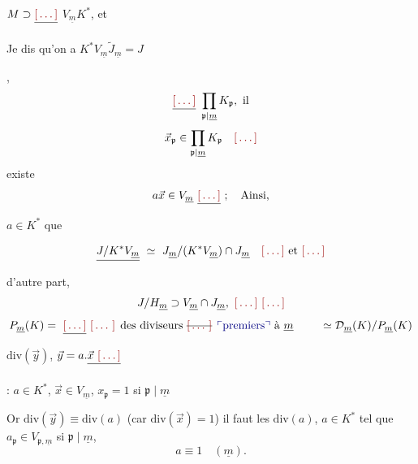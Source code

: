 \documentclass[11pt,a4paper]{article}
\begin{document}
 $M \supset \struck{\ill{}}$ $V_{\underline{m}} K^{*}$, et
 \ill{} \ill{} \ill{} \ill{}

Je dis qu'on a \struck{\ill{}} $K^{*} V_{\underline{m}} \tilde J_{\underline{m}} = J$ \ill{} \ill{}

 \ill{}  \ill{}, \struck{\ill{}} \ill{}
\ill{}
\[
\struck{\ill{}}\ \prod_{\mathfrak{p} \mid \underline{m}} K_{\mathfrak{p}}, \ \text{il}
\]
\ill{} \ill{} \ill{} \ill{}
\[
\vec{x}_{\mathfrak{p}} \in \prod_{\mathfrak{p}\mid\underline{m}} K_{\mathfrak{p}} \quad \ill{}
\]
existe  \ill{} \ill{}
\[
a \vec{x} \in V_{\underline{m}} \ \struck{\ill{}}\ ; \quad \text{Ainsi,}
\]
$a \in K^{*}$  que \ill{}

\ill{} \ill{}
\[
\struck{J/K^{*}V_{\underline{m}}}\ \simeq\ J_{\underline{m}}/(K^{*}V_{\underline{m}}) \cap J_{\underline{m}} \quad \ill{} \ \text{et} \ \ill{}
\]
d'autre part, 
\[
J/H_{\underline{m}} \supset V_{\underline{m}} \cap J_{\underline{m}}, \ \ill{} \ \ill{}
\]
\[
P_{\underline{m}}(K) = \ \struck{\ill{}}\ \text{\ill{} des diviseurs \struck{\ill{}} \add{premiers} à } \underline{m}
\qquad \ \simeq \mathcal{D}_{\underline{m}}(K)/P_{\underline{m}}(K)
\]
 \ill{} $\mathrm{div}(\vec{y})$, 
$\vec{y} = a . \struck{\vec{x}\ \ill{}}$ \ill{}

 :
$a \in K^{*}$, $\vec{x} \in V_{\underline{m}}$, \struck{\ill{}} $x_{\mathfrak{p}} = 1$ si $\mathfrak{p} \mid \underline{m}$

Or \ill{} \ill{} $\mathrm{div}(\vec{y}) \equiv \mathrm{div}(a)$ (car
$\mathrm{div}(\vec{x}) = 1$)  il faut \ill{}  les
$\mathrm{div}(a)$,  $a \in K^{*}$ \ill{} tel que
$a_{\mathfrak{p}} \in V_{\mathfrak{p},\underline{m}}$ si $\mathfrak{p} \mid
\underline{m}$, \ill{}  \ill{}
\[
a \equiv 1 \quad (\underline{m}).
\]
 \ill{}  \ill{}
\end{document}
